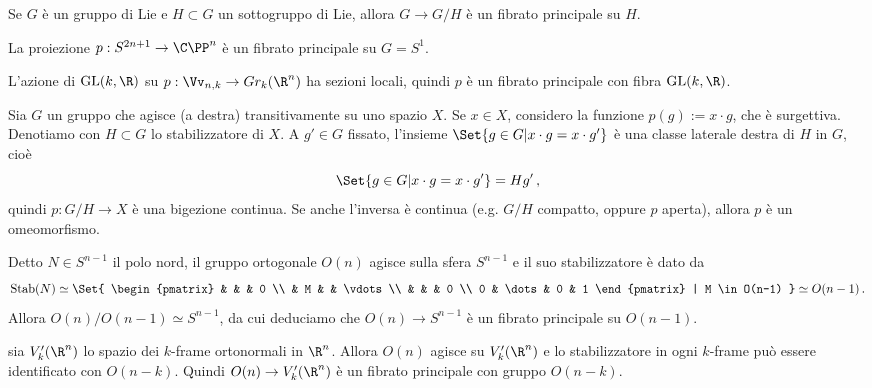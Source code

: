 \begin{ex}
	Se $G$ è un gruppo di Lie e $H \subset G$ un sottogruppo di Lie,
	allora $G \to G/H$ è un fibrato principale su $H$.
\end{ex}

\begin{ex}
	La proiezione $p : S^{2n+1} \to \C\PP^{n}$
	è un fibrato principale su $G=S^{1}$.
\end{ex}

\begin{exercise}
	L'azione di $\mathrm{GL}(k,\R)$ su $p:\Vv_{n,k} \to Gr_{k}(\R^{n})$
	ha sezioni locali, quindi $p$ è un fibrato principale con fibra $\mathrm{GL}(k,\R)$.
\end{exercise}

Sia $G$ un gruppo che agisce (a destra) transitivamente su uno spazio $X$.
Se $x \in X$, considero la funzione $p(g) := x \cdot g$, che è surgettiva.
Denotiamo con $H \subset G$ lo stabilizzatore di $X$. 
A $g' \in G$ fissato, l'insieme
$\Set{g \in G | x \cdot g = x \cdot g'}$
è una classe laterale destra di $H$ in $G$,
cioè
\begin{equation*}
	\Set{g \in G | x \cdot g = x \cdot g'} = Hg'\,,
\end{equation*}
quindi $p:G/H \to X$ è una bigezione continua.
Se anche l'inversa è continua (e.g. $G/H$ compatto, oppure $p$ aperta),
allora $p$ è un omeomorfismo.

\begin{ex}
	Detto $N \in S^{n-1}$ il polo nord, il gruppo ortogonale $O(n)$ agisce sulla sfera $S^{n-1}$ 
	e il suo stabilizzatore è dato da
	\begin{equation*}
	 	\mathrm{Stab}(N) \simeq 
	 	\Set{
	 	\begin{pmatrix}
	 		& & & 0 \\
	 		& M & & \vdots \\
	 		& & & 0 \\
	 		0 & \dots & 0 & 1
	 	\end{pmatrix} | M \in O(n-1)
	 	}
	 	\simeq O(n-1)\,.
	 \end{equation*} 
	 Allora $O(n)/O(n-1) \simeq S^{n-1}$, da cui deduciamo che $O(n) \to S^{n-1}$
	 è un fibrato principale su $O(n-1)$.
\end{ex}

\begin{ex}
	sia $V_{k}'(\R^{n})$ lo spazio dei $k$-frame ortonormali in $\R^{n}$.
	Allora $O(n)$ agisce su $V_{k}'(\R^{n})$ e lo stabilizzatore in ogni $k$-frame
	può essere identificato con $O(n-k)$. Quindi $O(n) \to V_{k}'(\R^{n})$ è un
	fibrato principale con gruppo $O(n-k)$.
\end{ex}

